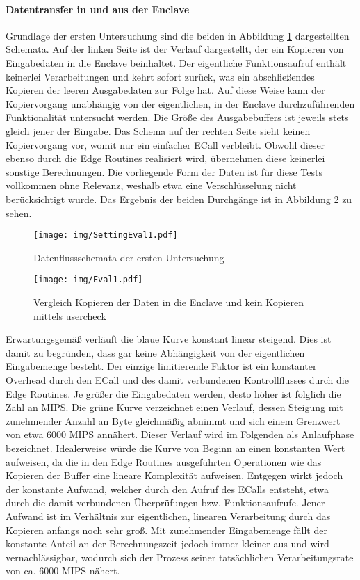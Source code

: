 \paragraph{Datentransfer in und aus der Enclave}

Grundlage der ersten Untersuchung sind die beiden in Abbildung \ref{fig:settingeval1} dargestellten Schemata. Auf der linken Seite ist der Verlauf dargestellt, der ein Kopieren von Eingabedaten in die Enclave beinhaltet. Der eigentliche Funktionsaufruf enthält keinerlei Verarbeitungen und kehrt sofort zurück, was ein abschließendes Kopieren der leeren Ausgabedaten zur Folge hat. Auf diese Weise kann der Kopiervorgang unabhängig von der eigentlichen, in der Enclave durchzuführenden Funktionalität untersucht werden. Die Größe des Ausgabebuffers ist jeweils stets gleich jener der Eingabe. Das Schema auf der rechten Seite sieht keinen Kopiervorgang vor, womit nur ein einfacher \ac{ECall} verbleibt. Obwohl dieser ebenso durch die Edge Routines realisiert wird, übernehmen diese keinerlei sonstige Berechnungen. Die vorliegende Form der Daten ist für diese Tests vollkommen ohne Relevanz, weshalb etwa eine Verschlüsselung nicht berücksichtigt wurde. Das Ergebnis der beiden Durchgänge ist in Abbildung \ref{fig:eval1} zu sehen.

\begin{figure}[h]
	\texttt{[image: img/SettingEval1.pdf]}
	\centering
	\caption{Datenflussschemata der ersten Untersuchung}
	\label{fig:settingeval1}
\end{figure}

\begin{figure}[h]
	\texttt{[image: img/Eval1.pdf]}
	\centering
	\caption{Vergleich Kopieren der Daten in die Enclave und kein Kopieren mittels user\textunderscore check}
	\label{fig:eval1}
\end{figure}

Erwartungsgemäß verläuft die blaue Kurve konstant linear steigend. Dies ist damit zu begründen, dass gar keine Abhängigkeit von der eigentlichen Eingabemenge besteht. Der einzige limitierende Faktor ist ein konstanter Overhead durch den \ac{ECall} und des damit verbundenen Kontrollflusses durch die Edge Routines. Je größer die Eingabedaten werden, desto höher ist folglich die Zahl an \ac{MIPS}. Die grüne Kurve verzeichnet einen Verlauf, dessen Steigung mit zunehmender Anzahl an Byte gleichmäßig abnimmt und sich einem Grenzwert von etwa 6000 \ac{MIPS} annähert. Dieser Verlauf wird im Folgenden als Anlaufphase bezeichnet. Idealerweise würde die Kurve von Beginn an einen konstanten Wert aufweisen, da die in den Edge Routines ausgeführten Operationen wie das Kopieren der Buffer eine lineare Komplexität aufweisen. Entgegen wirkt jedoch der konstante Aufwand, welcher durch den Aufruf des \acp{ECall} entsteht, etwa durch die damit verbundenen Überprüfungen bzw. Funktionsaufrufe. Jener Aufwand ist im Verhältnis zur eigentlichen, linearen Verarbeitung durch das Kopieren anfangs noch sehr groß. Mit zunehmender Eingabemenge fällt der konstante Anteil an der Berechnungszeit jedoch immer kleiner aus und wird vernachlässigbar, wodurch sich der Prozess seiner tatsächlichen Verarbeitungsrate von ca. 6000 \ac{MIPS} nähert.

